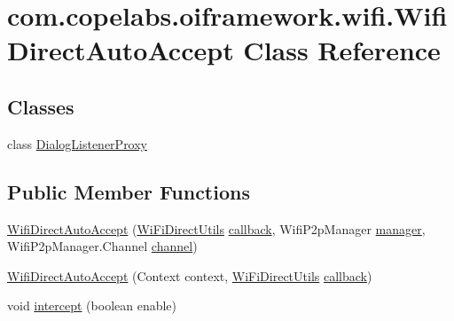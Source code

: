 \hypertarget{classcom_1_1copelabs_1_1oiframework_1_1wifi_1_1_wifi_direct_auto_accept}{}\section{com.\+copelabs.\+oiframework.\+wifi.\+Wifi\+Direct\+Auto\+Accept Class Reference}
\label{classcom_1_1copelabs_1_1oiframework_1_1wifi_1_1_wifi_direct_auto_accept}
\subsection*{Classes}
\begin{DoxyCompactItemize}
\item 
class \hyperlink{classcom_1_1copelabs_1_1oiframework_1_1wifi_1_1_wifi_direct_auto_accept_1_1_dialog_listener_proxy}{Dialog\+Listener\+Proxy}
\end{DoxyCompactItemize}
\subsection*{Public Member Functions}
\begin{DoxyCompactItemize}
\item 
\hyperlink{classcom_1_1copelabs_1_1oiframework_1_1wifi_1_1_wifi_direct_auto_accept_a3a1201c7b26eb0181c15053378aabb79}{Wifi\+Direct\+Auto\+Accept} (\hyperlink{classcom_1_1copelabs_1_1oiframework_1_1wifi_1_1_wi_fi_direct_utils}{Wi\+Fi\+Direct\+Utils} \hyperlink{classcom_1_1copelabs_1_1oiframework_1_1wifi_1_1_wifi_direct_auto_accept_a6aaded0496979f6174fb58fdff3f33dc}{callback}, Wifi\+P2p\+Manager \hyperlink{classcom_1_1copelabs_1_1oiframework_1_1wifi_1_1_wifi_direct_auto_accept_ab03dc3eda0d95b610267cecbc40086ef}{manager}, Wifi\+P2p\+Manager.\+Channel \hyperlink{classcom_1_1copelabs_1_1oiframework_1_1wifi_1_1_wifi_direct_auto_accept_a0492acbf9bee2fce0ebea454d311acce}{channel})
\item 
\hyperlink{classcom_1_1copelabs_1_1oiframework_1_1wifi_1_1_wifi_direct_auto_accept_abcc41f9ccdb18713c24d8ab8ee28a180}{Wifi\+Direct\+Auto\+Accept} (Context context, \hyperlink{classcom_1_1copelabs_1_1oiframework_1_1wifi_1_1_wi_fi_direct_utils}{Wi\+Fi\+Direct\+Utils} \hyperlink{classcom_1_1copelabs_1_1oiframework_1_1wifi_1_1_wifi_direct_auto_accept_a6aaded0496979f6174fb58fdff3f33dc}{callback})
\item 
void \hyperlink{classcom_1_1copelabs_1_1oiframework_1_1wifi_1_1_wifi_direct_auto_accept_ac1e91041ddf8c8fe4fabac8fedfe2f7e}{intercept} (boolean enable)
\end{DoxyCompactItemize}
